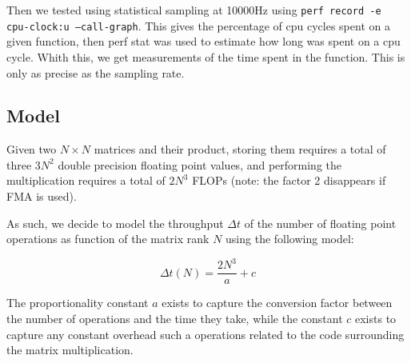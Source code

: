 \documentclass{article}
\begin{document}
Then we tested using statistical sampling at 10000Hz using \texttt{perf record -e cpu-clock:u --call-graph}. This gives the percentage of cpu cycles spent on a given function,
then perf stat was used to estimate how long was spent on a cpu cycle. Whith this, we get measurements of the time spent in the function. This is only as precise as the sampling rate. 



% 
% 



\subsection{Model}


Given two $N\times N$ matrices and their product, storing them requires a total of three $3N^2$ double precision floating point values, and performing the multiplication requires a total of $2N^3$ FLOPs (note: the factor 2 disappears if FMA is used).

As such, we decide to model the throughput $\Delta t$ of the number of floating point operations as function of the matrix rank $N$ using the following model:

\[\Delta t(N)=\frac{2N^3}{a}+c\]

The proportionality constant $a$ exists to capture the conversion factor between the number of operations and the time they take, while the constant $c$ exists to capture any constant overhead such a operations related to the code surrounding the matrix multiplication.
\end{document}
